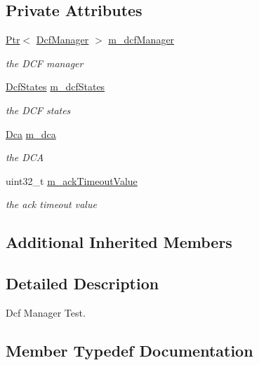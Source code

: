 \subsection*{Private Attributes}
\begin{DoxyCompactItemize}
\item 
\hyperlink{classns3_1_1Ptr}{Ptr}$<$ \hyperlink{classns3_1_1DcfManager}{Dcf\+Manager} $>$ \hyperlink{classDcfManagerTest_ac21f6faaf950603dcb1e681cf0e35626}{m\+\_\+dcf\+Manager}
\begin{DoxyCompactList}\small\item\em the D\+CF manager \end{DoxyCompactList}\item 
\hyperlink{classDcfManagerTest_a93260b3e7b9c75933d1cfbce5c2999a8}{Dcf\+States} \hyperlink{classDcfManagerTest_a77f7d700a37795d1d31614594e6a659e}{m\+\_\+dcf\+States}
\begin{DoxyCompactList}\small\item\em the D\+CF states \end{DoxyCompactList}\item 
\hyperlink{classDcfManagerTest_a06a5dafa891e87d80692c47eac2ce4b3}{Dca} \hyperlink{classDcfManagerTest_a9714d9806894e7d3e31172609f3f32b2}{m\+\_\+dca}
\begin{DoxyCompactList}\small\item\em the D\+CA \end{DoxyCompactList}\item 
uint32\+\_\+t \hyperlink{classDcfManagerTest_afbe6fd38a77863c1b0ecad897100da85}{m\+\_\+ack\+Timeout\+Value}
\begin{DoxyCompactList}\small\item\em the ack timeout value \end{DoxyCompactList}\end{DoxyCompactItemize}
\subsection*{Additional Inherited Members}


\subsection{Detailed Description}
Dcf Manager Test. 

\subsection{Member Typedef Documentation}
